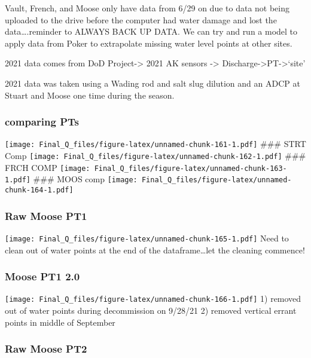 \documentclass[
]{article}
\begin{document}
Vault, French, and Moose only have data from 6/29 on due to data not
being uploaded to the drive before the computer had water damage and
lost the data\ldots.reminder to ALWAYS BACK UP DATA. We can try and run
a model to apply data from Poker to extrapolate missing water level
points at other sites.

2021 data comes from DoD Project-\textgreater{} 2021 AK sensors
-\textgreater{} Discharge-\textgreater PT-\textgreater{}`site'

2021 data was taken using a Wading rod and salt slug dilution and an
ADCP at Stuart and Moose one time during the season.

\hypertarget{comparing-pts-1}{%
\subsubsection{comparing PTs}\label{comparing-pts-1}}

\texttt{[image: Final\_Q\_files/figure-latex/unnamed-chunk-161-1.pdf]}
\#\#\# STRT Comp
\texttt{[image: Final\_Q\_files/figure-latex/unnamed-chunk-162-1.pdf]}
\#\#\# FRCH COMP
\texttt{[image: Final\_Q\_files/figure-latex/unnamed-chunk-163-1.pdf]}
\#\#\# MOOS comp
\texttt{[image: Final\_Q\_files/figure-latex/unnamed-chunk-164-1.pdf]}

\hypertarget{raw-moose-pt1-1}{%
\subsubsection{Raw Moose PT1}\label{raw-moose-pt1-1}}

\texttt{[image: Final\_Q\_files/figure-latex/unnamed-chunk-165-1.pdf]}
Need to clean out of water points at the end of the dataframe\ldots let
the cleaning commence!

\hypertarget{moose-pt1-2.0}{%
\subsubsection{Moose PT1 2.0}\label{moose-pt1-2.0}}

\texttt{[image: Final\_Q\_files/figure-latex/unnamed-chunk-166-1.pdf]} 1)
removed out of water points during decommission on 9/28/21 2) removed
vertical errant points in middle of September

\hypertarget{raw-moose-pt2-1}{%
\subsubsection{Raw Moose PT2}\label{raw-moose-pt2-1}}
\end{document}
